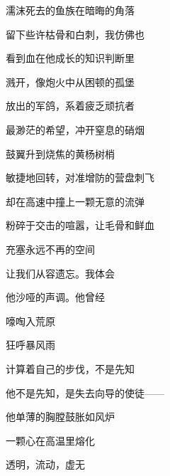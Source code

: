 濡沫死去的鱼族在暗晦的角落

留下些许枯骨和白刺，我仿佛也

看到血在他成长的知识判断里

溅开，像炮火中从困顿的孤堡

放出的军鸽，系着疲乏顽抗者

最渺茫的希望，冲开窒息的硝烟

鼓翼升到烧焦的黄杨树梢

敏捷地回转，对准增防的营盘刺飞

却在高速中撞上一颗无意的流弹

粉碎于交击的喧嚣，让毛骨和鲜血

充塞永远不再的空间

让我们从容遗忘。我体会

他沙哑的声调。他曾经

嚎啕入荒原

狂呼暴风雨
 
计算着自己的步伐，不是先知

他不是先知，是失去向导的使徒——

他单薄的胸膛鼓胀如风炉

一颗心在高温里熔化

透明，流动，虚无
